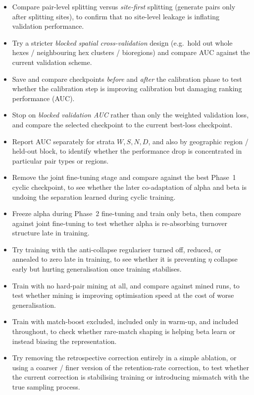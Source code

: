 \documentclass{article}
\begin{document}
\begin{itemize}
    \item Compare pair-level splitting versus \emph{site-first} splitting (generate pairs only after splitting sites), to confirm that no site-level leakage is inflating validation performance.
    \item Try a stricter \emph{blocked spatial cross-validation} design (e.g.\ hold out whole hexes / neighbouring hex clusters / bioregions) and compare AUC against the current validation scheme.
    \item Save and compare checkpoints \emph{before} and \emph{after} the calibration phase to test whether the calibration step is improving calibration but damaging ranking performance (AUC).
    \item Stop on \emph{blocked validation AUC} rather than only the weighted validation loss, and compare the selected checkpoint to the current best-loss checkpoint.
    \item Report AUC separately for strata \(W, S, N, D\), and also by geographic region / held-out block, to identify whether the performance drop is concentrated in particular pair types or regions.
    \item Remove the joint fine-tuning stage and compare against the best Phase~1 cyclic checkpoint, to see whether the later co-adaptation of alpha and beta is undoing the separation learned during cyclic training.
    \item Freeze alpha during Phase~2 fine-tuning and train only beta, then compare against joint fine-tuning to test whether alpha is re-absorbing turnover structure late in training.
    \item Try training with the anti-collapse regulariser turned off, reduced, or annealed to zero late in training, to see whether it is preventing \(\eta\) collapse early but hurting generalisation once training stabilises.
    \item Train with no hard-pair mining at all, and compare against mined runs, to test whether mining is improving optimisation speed at the cost of worse generalisation.
    \item Train with match-boost excluded, included only in warm-up, and included throughout, to check whether rare-match shaping is helping beta learn or instead biasing the representation.
    \item Try removing the retrospective correction entirely in a simple ablation, or using a coarser / finer version of the retention-rate correction, to test whether the current correction is stabilising training or introducing mismatch with the true sampling process.

\end{itemize}
\end{document}
